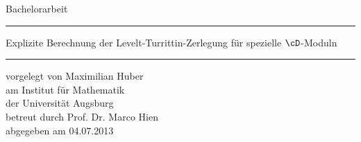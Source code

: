 \begin{titlepage}
  \thispagestyle{empty}
  \newcommand{\Rule}{%
    \textcolor{black}{\rule{\textwidth}{0.5mm}}%
  }
  \begin{center}\sffamily
    \normalfont\sffamily\large
    Bachelorarbeit
    \Rule
    \vspace{5mm}
    \Huge{Explizite Berechnung der Levelt-Turrittin-Zerlegung für spezielle
      $\cD$-Moduln}
    \vspace{1mm}
    \Rule
  \end{center}
    \normalfont\sffamily\large vorgelegt von \Large Maximilian Huber\\
    \normalfont\sffamily\large am            \Large Institut für Mathematik\\
    \normalfont\sffamily\large der           \Large Universität Augsburg\\
    \normalfont\sffamily\large betreut durch \Large Prof. Dr. Marco Hien\\
    \normalfont\sffamily\large abgegeben am  \Large 04.07.2013\\
    \vfill
    \vfill
\end{titlepage}
